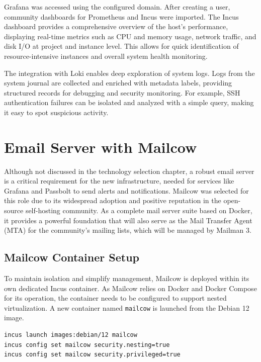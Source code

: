 Grafana was accessed using the configured domain. After creating a user, community dashboards for Prometheus and Incus were imported. The Incus dashboard provides a comprehensive overview of the host's performance, displaying real-time metrics such as CPU and memory usage, network traffic, and disk I/O at project and instance level. This allows for quick identification of resource-intensive instances and overall system health monitoring.

The integration with Loki enables deep exploration of system logs. Logs from the system journal are collected and enriched with metadata labels, providing structured records for debugging and security monitoring. For example, SSH authentication failures can be isolated and analyzed with a simple query, making it easy to spot suspicious activity.


\section{Email Server with Mailcow}
\label{sec:mailcow}

Although not discussed in the technology selection chapter, a robust email server is a critical requirement for the new infrastructure, needed for services like Grafana and Passbolt to send alerts and notifications. Mailcow was selected for this role due to its widespread adoption and positive reputation in the open-source self-hosting community. As a complete mail server suite based on Docker, it provides a powerful foundation that will also serve as the Mail Transfer Agent (MTA) for the community's mailing lists, which will be managed by Mailman 3.

\subsection*{Mailcow Container Setup}

To maintain isolation and simplify management, Mailcow is deployed within its own dedicated Incus container. As Mailcow relies on Docker and Docker Compose for its operation, the container needs to be configured to support nested virtualization\cite{incus-faq-docker-nesting}. A new container named \texttt{mailcow} is launched from the Debian 12 image.

\begin{lstlisting}[language=bash,caption={Creating and configuring the Mailcow container.}]
incus launch images:debian/12 mailcow
incus config set mailcow security.nesting=true
incus config set mailcow security.privileged=true
\end{lstlisting}

